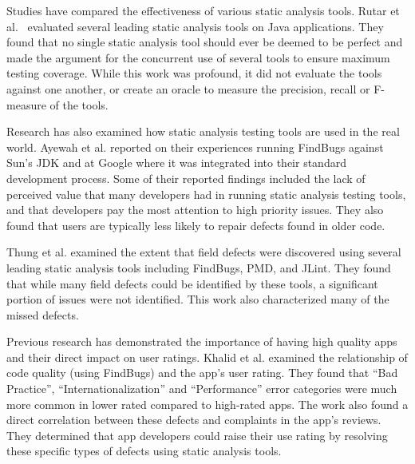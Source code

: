 \documentclass{sig-alternate}
\begin{document}
Studies have compared the effectiveness of various static analysis tools. Rutar et al.~\cite{Rutar:2004:CBF:1032654.1033833} evaluated several leading static analysis tools on Java applications. They found that no single static analysis tool should ever be deemed to be perfect and made the argument for the concurrent use of several tools to ensure maximum testing coverage. While this work was profound, it did not evaluate the tools against one another, or create an oracle to measure the precision, recall or F-measure of the tools.

Research has also examined how static analysis testing tools are used in the real world. Ayewah et al.\cite{4602670} reported on their experiences running FindBugs against Sun's JDK and at Google where it was integrated into their standard development process. Some of their reported findings included the lack of perceived value that many developers had in running static analysis testing tools, and that developers pay the most attention to high priority issues. They also found that users are typically less likely to repair defects found in older code.




Thung et al.\cite{Thung:2012:EWD:2351676.2351685} examined the extent that field defects were discovered using several leading static analysis tools including FindBugs, PMD, and JLint. They found that while many field defects could be identified by these tools, a significant portion of issues were not identified. This work also characterized many of the missed defects. %

Previous research has demonstrated the importance of having high quality apps and their direct impact on user ratings. Khalid et al.\cite{7006337} examined the relationship of code quality (using FindBugs) and the app's user rating. They found that ``Bad Practice'', ``Internationalization'' and ``Performance'' error categories were much more common in lower rated compared to high-rated apps. The work also found a direct correlation between these defects and complaints in the app's reviews. They determined that app developers could raise their use rating by resolving these specific types of defects using static analysis tools.
\end{document}
